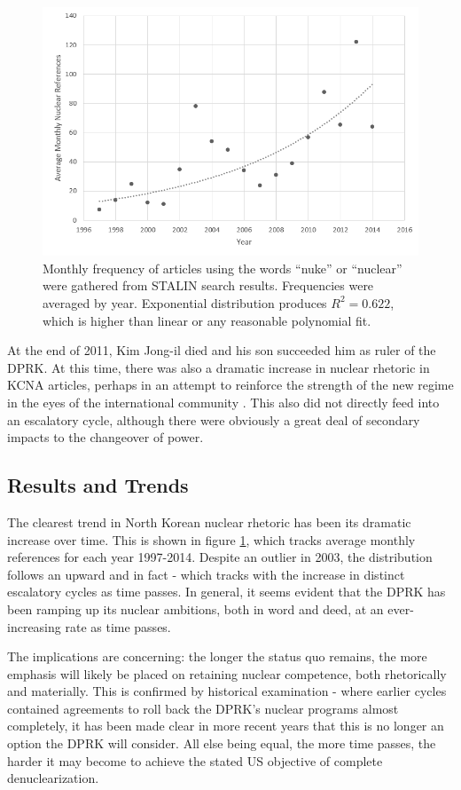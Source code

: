 \begin{figure}
\centering
	\includegraphics[width=0.7\linewidth]{../kcna_refs}
	\caption{Monthly frequency of articles using the words ``nuke'' or ``nuclear'' were gathered from STALIN search results. Frequencies were averaged by year. Exponential distribution produces $R^2=0.622$, which is higher than linear or any reasonable polynomial fit.}
\label{fig:kcna_refs}
\end{figure}


At the end of 2011, Kim Jong-il died and his son succeeded him as ruler of the DPRK. At this time, there was also a dramatic increase in nuclear rhetoric in KCNA articles, perhaps in an attempt to reinforce the strength of the new regime in the eyes of the international community \cite{rich14}. This also did not directly feed into an escalatory cycle, although there were obviously a great deal of secondary impacts to the changeover of power.

\subsection{Results and Trends}

The clearest trend in North Korean nuclear rhetoric has been its dramatic increase over time. This is shown in figure \ref{fig:kcna_refs}, which tracks average monthly references for each year 1997-2014. Despite an outlier in 2003, the distribution follows an upward and in fact  - which tracks with the increase in distinct escalatory cycles as time passes. In general, it seems evident that the DPRK has been ramping up its nuclear ambitions, both in word and deed, at an ever-increasing rate as time passes.

The implications are concerning: the longer the status quo remains, the more emphasis will likely be placed on retaining nuclear competence, both rhetorically and materially. This is confirmed by historical examination - where earlier cycles contained agreements to roll back the DPRK's nuclear programs almost completely, it has been made clear in more recent years that this is no longer an option the DPRK will consider. All else being equal, the more time passes, the harder it may become to achieve the stated US objective of complete denuclearization.

